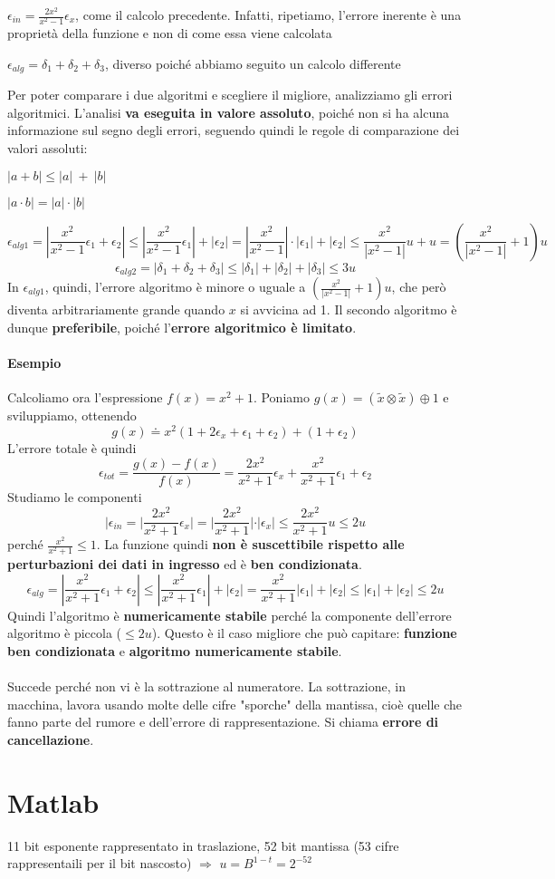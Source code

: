 \documentclass[10pt]{book}
\begin{document}
\begin{list}{}{Notiamo come}
	\item $\epsilon_{in} = \frac{2x^2}{x^2 - 1}\epsilon_x$, come il calcolo precedente. Infatti, ripetiamo, l'errore inerente è una proprietà della funzione e non di come essa viene calcolata
	\item $\epsilon_{alg} = \delta_1 + \delta_2 + \delta_3$, diverso poiché abbiamo seguito un calcolo differente
\end{list}
Per poter comparare i due algoritmi e scegliere il migliore, analizziamo gli errori algoritmici. L'analisi \textbf{va eseguita in valore assoluto}, poiché non si ha alcuna informazione sul segno degli errori, seguendo quindi le regole di comparazione dei valori assoluti:
\begin{list}{}{}
	\item $|a + b| \leq |a|\:+\:|b|$
	\item $|a\cdot b| = |a|\cdot|b|$
\end{list}
$$\epsilon_{alg1} = |\frac{x^2}{x^2 - 1}\epsilon_1 + \epsilon_2| \leq |\frac{x^2}{x^2 - 1}\epsilon_1| + |\epsilon_2| = |\frac{x^2}{x^2 - 1}|\cdot|\epsilon_1| + |\epsilon_2| \leq \frac{x^2}{|x^2 - 1|}u + u = (\frac{x^2}{|x^2 - 1|} + 1)u$$
$$\epsilon_{alg2} = |\delta_1 + \delta_2 + \delta_3| \leq |\delta_1| + |\delta_2| + |\delta_3| \leq 3u$$
In $\epsilon_{alg1}$, quindi, l'errore algoritmo è minore o uguale a $(\frac{x^2}{|x^2 - 1|} + 1)u$, che però diventa arbitrariamente grande quando $x$ si avvicina ad 1. Il secondo algoritmo è dunque \textbf{preferibile}, poiché l'\textbf{errore algoritmico è limitato}.
\paragraph{Esempio} Calcoliamo ora l'espressione $f(x) = x^2 + 1$. Poniamo $g(x) = (\tilde{x} \otimes \tilde{x}) \oplus 1$ e sviluppiamo, ottenendo $$g(x) \doteq x^2(1 + 2\epsilon_x + \epsilon_1 + \epsilon_2) + (1 + \epsilon_2)$$
L'errore totale è quindi
$$\epsilon_{tot} = \frac{g(x) - f(x)}{f(x)} = \frac{2x^2}{x^2 + 1}\epsilon_x + \frac{x^2}{x^2 + 1}\epsilon_1 + \epsilon_2$$ Studiamo le componenti
$$|\epsilon_{in} = |\frac{2x^2}{x^2 + 1}\epsilon_x| = |\frac{2x^2}{x^2 + 1}|\cdot|\epsilon_x| \leq \frac{2x^2}{x^2 + 1}u \leq 2u$$ perché $\frac{x^2}{x^2 + 1} \leq 1$. La funzione quindi \textbf{non è suscettibile rispetto alle perturbazioni dei dati in ingresso} ed è \textbf{ben condizionata}.
$$\epsilon_{alg} = |\frac{x^2}{x^2 + 1}\epsilon_1 + \epsilon_2| \leq |\frac{x^2}{x^2 + 1}\epsilon_1| + |\epsilon_2| = \frac{x^2}{x^2 + 1}|\epsilon_1| + |\epsilon_2| \leq |\epsilon_1| + |\epsilon_2| \leq 2u$$ Quindi l'algoritmo è \textbf{numericamente stabile} perché la componente dell'errore algoritmo è piccola ($\leq 2u$). Questo è il caso migliore che può capitare: \textbf{funzione ben condizionata} e \textbf{algoritmo numericamente stabile}.\\\\
Succede perché non vi è la sottrazione al numeratore. La sottrazione, in macchina, lavora usando molte delle cifre "sporche" della mantissa, cioè quelle che fanno parte del rumore e dell'errore di rappresentazione. Si chiama \textbf{errore di cancellazione}.
\section{Matlab}
11 bit esponente rappresentato in traslazione, 52 bit mantissa (53 cifre rappresentaili per il bit nascosto) $\Rightarrow$ $u = B^{1-t} = 2^{-52}$
\end{document}
